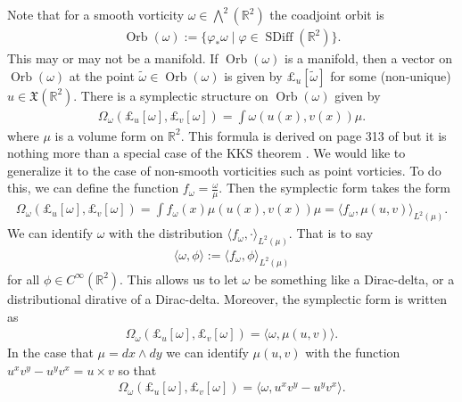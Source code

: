 \documentclass[12pt]{amsart}
\newcommand{\R}{\ensuremath{\mathbb{R}}}
\DeclareMathOperator{\SDiff}{SDiff}
\DeclareMathOperator{\Orb}{Orb}
\begin{document}
Note that for a smooth vorticity $\omega \in \bigwedge^2(\R^2)$
the coadjoint orbit is
\begin{align*}
  \Orb(\omega) := \{ \varphi_* \omega \mid \varphi \in \SDiff(\R^2) \}.
\end{align*}
This may or may not be a manifold.
If $\Orb(\omega)$ is a manifold, then a vector on $\Orb(\omega)$ at the point $\tilde{\omega} \in \Orb(\omega)$ is given by $\pounds_u[\tilde\omega]$ for some (non-unique) $u \in \mathfrak{X}(\R^2)$. There is a symplectic structure on $\Orb(\omega)$
given by
\begin{align*}
  \Omega_\omega( \pounds_u[\omega] , \pounds_v[\omega] ) = \int \omega( u(x), v(x) ) \mu.
\end{align*}
where $\mu$ is a volume form on $\R^2$.
This formula is derived on page 313 of \cite{MarsdenWeinstein1983}
but it is nothing more than a special case of the KKS theorem \cite[see the boxed formula on p.303]{FOM}.
We would like to generalize it to the case of non-smooth vorticities such
as point vorticies.  To do this, we can define the function $f_\omega = \frac{\omega}{\mu}$.  Then the symplectic form takes the form
\begin{align*}
  \Omega_\omega( \pounds_u[\omega] , \pounds_v[\omega] ) = \int f_{\omega}(x) \mu( u(x), v(x) ) \mu = \langle f_{\omega}, \mu(u,v) \rangle_{L^2(\mu)}.
\end{align*}
We can identify $\omega$ with the distribution $\langle f_\omega , \cdot \rangle_{L^2(\mu)}$.
That is to say
\begin{align*}
  \langle \omega , \phi \rangle := \langle f_\omega , \phi \rangle_{L^2(\mu)}
\end{align*}
for all $\phi \in C^\infty(\R^2)$.
This allows us to let $\omega$ be something like a Dirac-delta,
or a distributional dirative of a Dirac-delta.
Moreover, the symplectic form is written as
\begin{align*}
  \Omega_\omega( \pounds_u[\omega], \pounds_v[\omega]) = \langle \omega , \mu(u,v) \rangle.
\end{align*}
In the case that $\mu = dx \wedge dy$ we can 
identify $\mu(u,v)$ with the function $u^x v^y - u^y v^x = u \times v$ so that
\begin{align*}
  \Omega_\omega( \pounds_u[\omega], \pounds_v[\omega]) = \langle \omega , u^x v^y - u^y v^x \rangle.
\end{align*}
\end{document}
